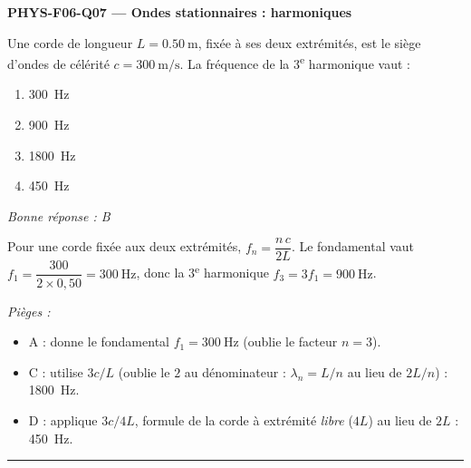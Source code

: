 \documentclass[11pt,a4paper]{article}
\begin{document}
\noindent\textbf{PHYS-F06-Q07 --- Ondes stationnaires : harmoniques}\par
Une corde de longueur $L = \qty{0.50}{\metre}$, fixée à ses deux extrémités, est le siège d'ondes de célérité $c = \qty{300}{\metre\per\second}$. La fréquence de la 3\textsuperscript{e} harmonique vaut :
\begin{enumerate}[label=\Alph*)]
\item \qty{300}{\hertz}
\item \qty{900}{\hertz}
\item \qty{1800}{\hertz}
\item \qty{450}{\hertz}
\end{enumerate}
\textit{Bonne réponse : B}\par
Pour une corde fixée aux deux extrémités, $f_n = \dfrac{n\,c}{2L}$. Le fondamental vaut $f_1 = \dfrac{300}{2\times0{,}50} = \qty{300}{\hertz}$, donc la 3\textsuperscript{e} harmonique $f_3 = 3f_1 = \qty{900}{\hertz}$.\par
\textit{Pièges :}
\begin{itemize}
\item A : donne le fondamental $f_1 = \qty{300}{\hertz}$ (oublie le facteur $n = 3$).
\item C : utilise $3c/L$ (oublie le $2$ au dénominateur : $\lambda_n = L/n$ au lieu de $2L/n$) : \qty{1800}{\hertz}.
\item D : applique $3c/4L$, formule de la corde à extrémité \emph{libre} ($4L$) au lieu de $2L$ : \qty{450}{\hertz}.
\end{itemize}
\vspace{8pt}\hrule\vspace{8pt}
\end{document}
